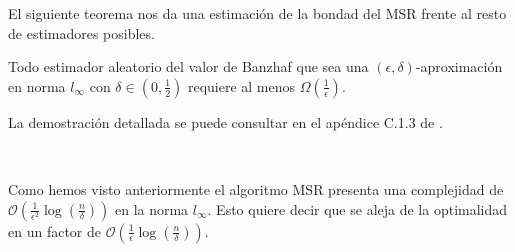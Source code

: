 El siguiente teorema nos da una estimación de la bondad del
MSR frente al resto de estimadores posibles.

\begin{theorem}
  Todo estimador aleatorio del valor de Banzhaf
  que sea una $(\epsilon,\delta)$-aproximación en norma
  $l_{\infty}$ con $\delta \in (0,\frac{1}{2})$ requiere
  al menos $\Omega(\frac{1}{\epsilon})$.
\end{theorem}

La demostración detallada se puede consultar en el apéndice
C.1.3 de \cite{dataBanzhaf}.

\

Como hemos visto anteriormente el algoritmo MSR presenta
una complejidad de $\mathcal{O}(\frac{1}{\epsilon^2}
\log(\frac{n}{\delta}))$ en la norma $l_{\infty}$.
Esto quiere decir que se aleja de la optimalidad
en un factor de $\mathcal{O}(\frac{1}{\epsilon}
\log(\frac{n}{\delta}))$.